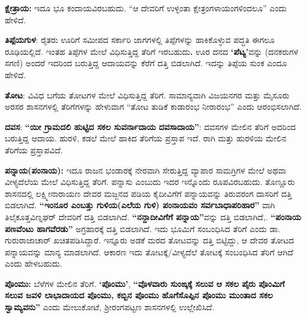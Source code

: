 \textbf{ಕ್ಷೇತ್ರಾಯ: } ಇದೂ ಭೂ ಕಂದಾಯವಿರಬಹುದು. “ಆ ದೇವರಿಗೆ ಉಳ್ಳಂತಾ ಕ್ಷೇತ್ರಂಗಳಾಯಂಗಳಿಂದಲೂ” ಎಂದು ಹೇಳಿದೆ.

\textbf{ತಿಪ್ಪೆಯಗುಳ}: ರೈತರು ಊರಿಗೆ ಸಮೀಪದ ಸರ್ಕಾರಿ ಜಾಗಗಳಲ್ಲಿ ತಿಪ್ಪೆಗಳನ್ನು ಹಾಕಿಕೊಳ್ಳುವ ಪದ್ಧತಿ ಈಗಲೂ ರೂಢಿಯಲ್ಲಿದೆ. ಇಂತಹ ತಿಪ್ಪೆಗಳ ಮೇಲೆ ವಿಧಿಸುತ್ತಿದ್ದ ತೆರಿಗೆ ಇರಬಹುದು\textbf{.} ಊರ ದನದ \textbf{‘ಪೆಟ್ಯ’}ವನ್ನು (ದನಕರುಗಳ ಸಗಣಿ) ಅಂದರೆ ಇದರಿಂದ ಬರುತ್ತಿದ್ದ ಆದಾಯವನ್ನು ಕೆರೆಗೆ ದತ್ತಿ ಬಿಡಲಾಗಿದೆ. ಇದನ್ನು ತಿಪ್ಪೆಯ ಸುಂಕ ಎಂದೂ ಹೇಳಿದೆ.

\textbf{ತೋಟ}: ವಿವಿಧ ಬಗೆಯ ತೋಟಗಳ ಮೇಲೆ ವಿಧಿಸುತ್ತಿದ್ದ ತೆರಿಗೆ. ಸಾಮಾನ್ಯವಾಗಿ ವಿಜಯನಗರ ಮತ್ತು ಮೈಸೂರು ಅರಸರ ಶಾಸನಗಳಲ್ಲಿ ತೆರಿಗೆಗಳನ್ನು ಹೇಳುವಾಗ “ತೋಟ ತುಡಿಕೆ ಕಾಡಾರಂಭ ನೀರಾರಂಭ” ಎಂದು ಆರಂಭಿಸಲಾಗಿದೆ.

\textbf{ದವಸ}: \textbf{“ಯೀ ಗ್ರಾಮದಲಿ ಹುಟ್ಟಿದ ಸಕಲ ಸುವರ್ನಾದಾಯ ದವಸಾದಾಯ”}: ದವಸಗಳ ಮೇಲಿನ ತೆರಿಗೆ ಅದರಿಂದ ಬರುತ್ತಿದ್ದ ಆದಾಯ. ಹುರಳಿ, ಕಡಲೆ ಮೇಲೆ ಹಾಕಿದ ತೆರಿಗೆಯ ಪ್ರಸ್ತಾಪ ಇದೆ. ರಾಗಿ ಮತ್ತು ಹುರಳಿಯ ಮೇಲಿನ ತೆರಿಗೆಯ ಪ್ರಸ್ತಾಪವಿದೆ.

\textbf{ಪನ್ನಾಯ(ಪಂನಾಯ):} ಇದೂ ರಾಜನ ಭಂಡಾರಕ್ಕೆ ನೇರವಾಗಿ ಸೇರುತ್ತಿದ್ದ ವ್ಯಾಪಾರ ಸಾಮಗ್ರಿಗಳ ಮೇಲೆ ಅಥವಾ ವೀಳ್ಯದೆಲೆಯ ಮೇಲೆ ವಿಧಿಸುತ್ತಿದ್ದ ತೆರಿಗೆ. ಪನ್ನಾಸು ಎಂಬುದು ಇದರ ಇನ್ನೊಂದು ರೂಪವಿರಬಹುದು. ತೊಣ್ಣೂರು ಶಾಸನದಲ್ಲಿ ಲಕ್ಷ್ಮೀನಾರಾಯಣ ದೇವರ ಮಜ್ಜನದ ಪಡಿಯ ಕೈದೀವಿಗೆಗೆ ಪನ್ನಾಯವನ್ನು ತಿರುವರಂಗ ದಾಸರಿಗೆ ದತ್ತಿ ಬಿಡಲಾಗಿದೆ.\textbf{ “ಇಂನೂರ ಎಂಬತ್ತು ಗುಳಿಯ(ಎಲೆಯ ಗುಳಿ) ಪಂನಾಯವಂ ಸರ್ವಬಾಧಾಪರಿಹಾರ”} ವಾಗಿ ತಿಲೈಕೂತ್ತವಿಣ್ನಘರ್​ ದೇವರಿಗೆ ದತ್ತಿ ಬಿಡಲಾಗಿದೆ.\textbf{ “ನನ್ದಾದೀವಿಗೆಗೆ ಪನ್ನಾಯ”}ವನ್ನು ದತ್ತಿ ಬಿಡಲಾಗಿದೆ,. \textbf{ “ಪಂನಾಯ ಪಣವೆಂಟು ಹಾಗವೆರಡು”} ಅಗ್ರಹಾರಕ್ಕೆ ದತ್ತಿ ಬಿಡಲಾಗಿದೆ. ಇದು ಭೂಮಿಗೆ ಸಂಬಂಧಿಸಿದ ತೆರಿಗೆ ಎಂದು ಡಾ. ಗುರುರಾಜಾಚಾರ್​ ಖಚಿತಪಡಿಸಿದ್ದಾರೆ. ಇನ್ನೂರು ಅಡಕೆ ಮರದ ತೋಟವನ್ನು ದತ್ತಿ ಬಿಟ್ಟಿದ್ದು, ಆ ದೇವರ ತೋಟದ ಪನ್ನಾಯವನ್ನು ಮಾನ್ಯ ಮಾಡಲಾಗಿದೆ. ಆಕಾರಣ ಇದು ತೋಟಕ್ಕೆ/ವೀಳ್ಯದೆಲೆ ತೋಟಕ್ಕೆ ಸಂಬಂಧಿಸಿದ ತೆರಿಗೆ ಆಗಿದೆ ಎಂದು ಹೇಳಬಹುದು.

\textbf{ಪೊಂಮು:} ಬೆಳೆಗಳ ಮೇಲಿನ ತೆರಿಗೆ.\textbf{ ‘ಪೊಂಮು’},\textbf{ “ವೊಳವಾರು ಸುಂಙ್ಕಕ್ಕೆ ಸಲುವ ಆ ಸಕಲ ಪೈರು ಪೊಂಮಿಗೆ ಸಲುವ ಜವಳಿ ಲಾಭಾದಾಯದ ಪೊಂಮು, ಕಬ್ಬಿನ ಪೊಂಮು ಹೊಗೆಸೊಪ್ಪಿನ ಪೊಂಮು ಮುಂತಾದ ಸಕಲ ಸ್ವಾಮ್ಯವನು”} ಎಂದು ಮೇಲುಕೋಟೆ, ಶ‍್ರೀರಂಗಪಟ್ಟಣ ಶಾಸನಗಳಲ್ಲಿ ಉಲ್ಲೇಖಿಸಿದೆ.

